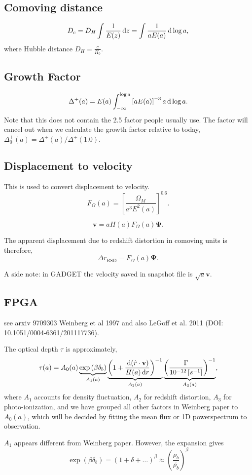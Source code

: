 \documentclass{paper}
\begin{document}
\subsection{Comoving distance}
\[
    D_c = D_H \int \frac{1}{E(z)} \,\mathrm{d} z 
        = \int \frac{1}{a E(a)} \,\mathrm{d} \log a,
\]
where Hubble distance $D_H = \frac{c}{H_0}$.
\subsection{Growth Factor}
\[
    \Delta^+(a) = E(a) 
\int_{-\infty}^{\log a} \left[a E(a)\right]^{-3} a \,\mathrm{d} \log a .
\]
Note that this does not contain the 2.5 factor people
usually use. The factor will cancel out when we calculate
the growth factor relative to today,
$\Delta^+_0(a) = \Delta^+(a) / \Delta^+(1.0)$.
\subsection{Displacement to velocity}
This is used to convert displacement to velocity. 
\[
    F_\Omega(a) = \left[\frac{\Omega_M}{a^3 E^2(a)}\right]^{0.6} .
\]

\[
    \mathbf{v} = a H(a) F_\Omega(a) \mathbf{\Psi} .
\]

The apparent displacement due to redshift distortion in
comoving units is therefore,
\[
    \Delta r_\mathrm{RSD} = F_\Omega(a) \mathbf{\Psi} .
\]

A side note: in GADGET the velocity saved in snapshot file is 
$\sqrt{a}\mathbf{v}$.

\subsection{FPGA}
see arxiv 9709303 Weinberg et al 1997 and also  LeGoff et
al. 2011 (DOI: 10.1051/0004-6361/201117736).

The optical depth $\tau$ is approximately,
\[  \tau(a) = 
    A_0(a)
    \underbrace{
        \exp \left(\beta \delta_b \right)
    }_{A_1(a)}
    \underbrace{
        \left(1 + 
        \frac{\diff ( \hat{r} \cdot \mathbf{v})}
        {H(a) \diff r } \right)^{-1}
    }_{A_2(a)}
    \underbrace{
        \left(\frac{\Gamma}{\unit[10^{-12}][s^{-1}]}
        \right)^{-1}
    }_{A_3(a)}
    ,
\] where $A_1$ accounts for density fluctuation, 
         $A_2$ for redshift distortion, 
         $A_3$ for photo-ionization, 
   and we have grouped all other factors in Weinberg paper to $A_0(a)$, 
   which will be decided by fitting the mean flux or 1D
   powerspectrum to observation.

   $A_1$ appears different from Weinberg paper. However, the
   expansion gives
   \[ 
     \exp \left( \beta \delta_b \right)
     = (1 + \delta + \dots)^\beta
     \approx \left(\frac{\rho_b}{\bar{\rho_b}}\right)^\beta
   \]
\end{document}
